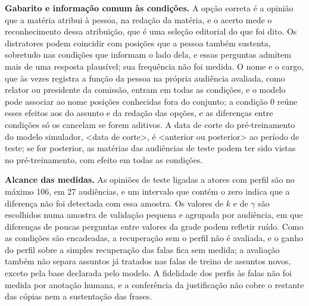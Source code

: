 \textbf{Gabarito e informação comum às condições.} A opção correta é a opinião que a matéria atribui à
pessoa, na redação da matéria, e o acerto mede o reconhecimento dessa atribuição, que é uma seleção
editorial do que foi dito. Os distratores podem coincidir com posições que a pessoa também sustenta,
sobretudo nas condições que informam o lado dela, e essas perguntas admitem mais de uma resposta
plausível; sua frequência não foi medida. O nome e o cargo, que às vezes registra a função da pessoa
na própria audiência avaliada, como relator ou presidente da comissão, entram em todas as condições,
e o modelo pode associar ao nome posições conhecidas fora do conjunto; a condição 0 reúne esses
efeitos aos do assunto e da redação das opções, e as diferenças entre condições só os cancelam se
forem aditivos. A data de corte do pré-treinamento do modelo simulador, <data de corte>, é <anterior
ou posterior> ao período de teste; se for posterior, as matérias das audiências de teste podem ter
sido vistas no pré-treinamento, com efeito em todas as condições.

\textbf{Alcance das medidas.} As opiniões de teste ligadas a atores com perfil são no máximo 106, em
27 audiências, e um intervalo que contém o zero indica que a diferença não foi detectada com essa
amostra. Os valores de $k$ e de $\gamma$ são escolhidos numa amostra de validação pequena e agrupada
por audiência, em que diferenças de poucas perguntas entre valores da grade podem refletir ruído. Como
as condições são encadeadas, a recuperação sem o perfil não é avaliada, e o ganho do perfil sobre a
simples recuperação das falas fica sem medida; a avaliação também não separa assuntos já tratados nas
falas de treino de assuntos novos, exceto pela base declarada pelo modelo. A fidelidade dos perfis às
falas não foi medida por anotação humana, e a conferência da justificação não cobre o restante das
cópias nem a sustentação das frases.
